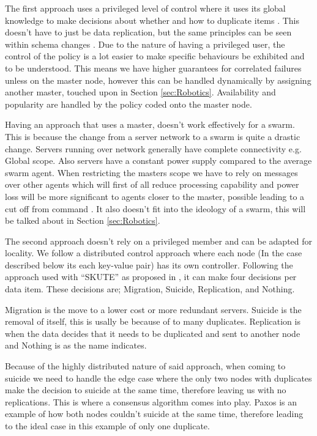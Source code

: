 \documentclass{UoYCSproject}
\begin{document}
The first approach uses a privileged level of control where it uses its global knowledge to make decisions about whether and how to duplicate items \cite{Avalability storage, Patent}. 
This doesn’t have to just be data replication, but the same principles can be seen within schema changes \cite{Scheme changes}. 
Due to the nature of having a privileged user, the control of the policy is a lot easier to make specific behaviours be exhibited and to be understood. 
This means we have higher guarantees for correlated failures unless on the master node, however this can be handled dynamically by assigning another master, touched upon in Section \ref{sec:Robotics}. 
Availability and popularity are handled by the policy coded onto the master node.

Having an approach that uses a master, doesn’t work effectively for a swarm. 
This is because the change from a server network to a swarm is quite a drastic change. 
Servers running over network generally have complete connectivity e.g. Global scope. 
Also servers have a constant power supply compared to the average swarm agent. 
When restricting the masters scope we have to rely on messages over other agents which will first of all reduce processing capability and power loss will be more significant to agents closer to the master, possible leading to a cut off from command \cite{Swarm robotics reviewed}. 
It also doesn’t fit into the ideology of a swarm, this will be talked about in Section \ref{sec:Robotics}.

The second approach doesn’t rely on a privileged member and can be adapted for locality. 
We follow a distributed control approach where each node (In the case described below its each key-value pair) has its own controller. 
Following the approach used with “SKUTE” as proposed in \cite{Distributed Storage}, it can make four decisions per data item. 
These decisions are; Migration, Suicide, Replication, and Nothing.

Migration is the move to a lower cost or more redundant servers. 
Suicide is the removal of itself, this is usally be because of to many duplicates. 
Replication is when the data decides that it needs to be duplicated and sent to another node and Nothing is as the name indicates.

Because of the highly distributed nature of said approach, when coming to suicide we need to handle the edge case where the only two nodes with duplicates make the decision to suicide at the same time, therefore leaving us with no replications. 
This is where a consensus algorithm comes into play. 
Paxos \cite{Paxos} is an example of how both nodes couldn’t suicide at the same time, therefore leading to the ideal case in this example of only one duplicate. 
\end{document}
